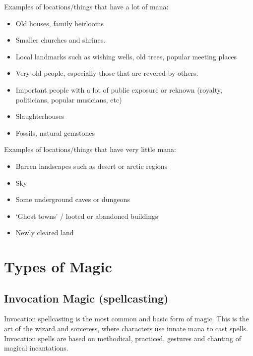 \documentclass[twoside]{book}
\begin{document}
    {  
      Examples of locations/things that have a lot of mana:
             
    }
  
\begin{itemize}
      
  \item   Old houses, family heirlooms 
  \item   Smaller churches and shrines. 
  \item   Local landmarks such as wishing wells, old trees,
               popular meeting places 
  \item   Very old people, especially those that are revered
               by others. 
  \item   Important people with a lot of public exposure or
               reknown (royalty, politicians, popular musicians, etc)
               
  \item   Slaughterhouses 
  \item   Fossils, natural gemstones 
\end{itemize}
  
    {  
      Examples of locations/things that have very little
             mana: 
    }
  
\begin{itemize}
      
  \item   Barren landscapes such as desert or arctic regions
               
  \item   Sky 
  \item   Some underground caves or dungeons 
  \item   `Ghost towns' / looted or abandoned
               buildings 
  \item   Newly cleared land 
\end{itemize}
  
    

\section{Types of Magic}
    
    

\subsection{Invocation Magic (spellcasting)}
    
    {  
      Invocation spellcasting is the most common and
               basic form of magic. This is the art of the wizard and
               sorceress, where characters use innate mana to cast
               spells. Invocation spells are based on methodical,
               practiced, gestures and chanting of magical incantations.
               
    }
  
\end{document}
